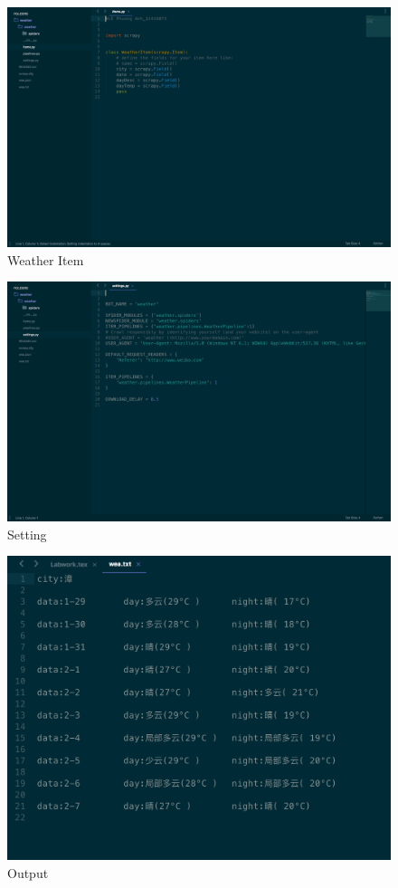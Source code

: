 \documentclass{article}
\begin{document}
\begin{figure}[ht]
  \includegraphics[width=\linewidth]{item2}
  \caption{Weather Item}
  \label{fig:WeatherItem}
\end{figure}
\begin{figure}[ht]
  \includegraphics[width=\linewidth]{item3}
  \caption{Setting}
  \label{fig:Setting}
\end{figure}
\begin{figure}[ht]
  \includegraphics[width=\linewidth]{item4}
  \caption{Output}
  \label{fig:Output}
\end{figure}
\end{document}
